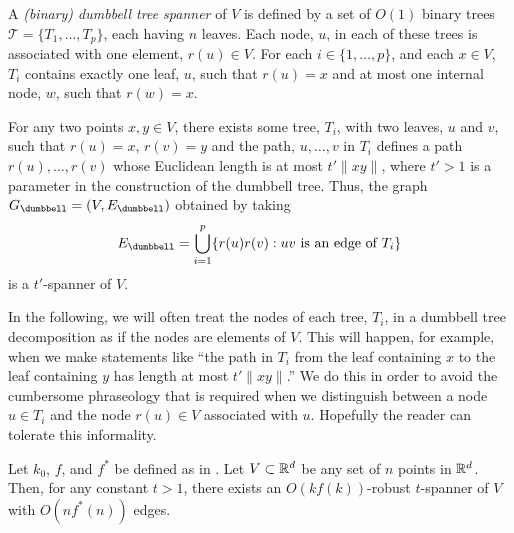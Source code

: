 \documentclass{patmorin}
\begin{document}
A \emph{(binary) dumbbell tree spanner} of $V$ is defined by a set of
$O(1)$ binary trees $\mathcal{T}=\{T_1,\ldots,T_p\}$, each having $n$
leaves.  Each node, $u$, in each of these trees is associated with one
element, $r(u)\in V$.  For each $i\in\{1,\ldots,p\}$, and each $x\in V$,
$T_i$ contains exactly one leaf, $u$, such that $r(u)=x$ and at most
one internal node, $w$, such that $r(w)=x$.

For any two points $x,y\in V$, there exists some tree, $T_i$,
with two leaves, $u$ and $v$, such that $r(u)=x$, $r(v)=y$ and
the path, $u,\ldots,v$ in $T_i$ defines a path $r(u),\ldots,r(v)$
whose Euclidean length is at most $t'\|xy\|$, where $t'>1$ is a
parameter in the construction of the dumbbell tree.  Thus, the graph
$G_\dumbbell=(V,E_\dumbbell)$ obtained by taking
\[
   E_\dumbbell = \bigcup_{i=1}^p\{r(u)r(v) : \text{$uv$ is an edge of $T_i$} \}
\]
is a $t'$-spanner of $V$.  

In the following, we will often treat the nodes of each tree, $T_i$,
in a dumbbell tree decomposition as if the nodes are elements of $V$.
This will happen, for example, when we make statements like ``the path
in $T_i$ from the leaf containing $x$ to the leaf containing $y$ has
length at most $t'\|xy\|$.''  We do this in order to avoid the cumbersome
phraseology that is required when we distinguish between a node $u\in T_i$
and the node $r(u)\in V$ associated with $u$.  Hopefully the reader can
tolerate this informality.

\begin{thm}
  Let $k_0$, $f$, and $f^*$ be defined as in .
  Let $V\subset \mathbb{R}^d$ be any set of $n$ points in $\mathbb{R}^d$.  Then, for any
  constant $t>1$,  there exists an $O(kf(k))$-robust $t$-spanner of $V$
  with $O(nf^*(n))$ edges.
\end{thm}
\end{document}
